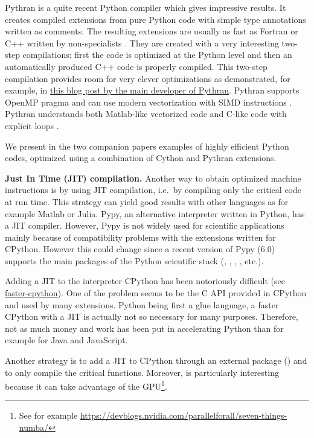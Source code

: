 Pythran \citep{guelton2015pythran, guelton2018pythran} is a quite recent Python
compiler which gives impressive results. It creates compiled extensions from pure
Python code with simple type annotations written as comments.
%
The resulting extensions are usually as fast as Fortran or C++ written by
non-specialists \cite[see, for example, benchmarks for the packages
 and ,][]{fluidfft, fluidsim}.
%
They are created with a very interesting two-step compilations: first the code
is optimized at the Python level and then an automatically produced C++ code is
properly compiled.
%
This two-step compilation provides room for very clever optimizations as
demonstrated, for example, in
\href{http://serge-sans-paille.github.io/pythran-stories/%
being-more-than-a-translator.html}{%
this blog post by the main developer of Pythran}.
%
Pythran supports OpenMP pragma \citep{guelton2013compiling} and can use modern
vectorization with SIMD instructions \citep{guelton2014exploring}. Pythran
understands both Matlab-like vectorized code and C-like code with explicit loops
\citep{guelton2018pythran}.

We present in the two companion papers \citep{fluidfft, fluidsim} examples of
highly efficient Python codes, optimized using a combination of Cython and
Pythran extensions.

\textbf{Just In Time (JIT) compilation.} Another way to obtain optimized
machine instructions is by using JIT compilation, i.e.\ by compiling only the
critical code at run time.
%
This strategy can yield good results with other languages as for example Matlab
or Julia.
%
Pypy, an alternative interpreter written in Python, has a JIT compiler. However,
Pypy is not widely used for scientific applications mainly because of
compatibility problems with the extensions written for CPython.
%
However this could change since a recent version of Pypy (6.0) supports the main
packages of the Python scientific stack (\Numpy, \Scipy, ,
, etc.).

Adding a JIT to the interpreter CPython has been notoriously difficult (see
\href{https://faster-cpython.readthedocs.io/}{faster-cpython}). One of the
problem seems to be the C API provided in CPython and used by many extensions.
%
Python being first a glue language, a faster CPython with a JIT is actually not
so necessary for many purposes. Therefore, not as much money and work has been
put in accelerating Python than for example for Java and JavaScript.

Another strategy is to add a JIT to CPython through an external package
() and to only compile the critical functions.  Moreover,
 is particularly interesting because it can take advantage of the
GPU\footnote{See for example
\url{https://devblogs.nvidia.com/parallelforall/seven-things-numba/}}.


